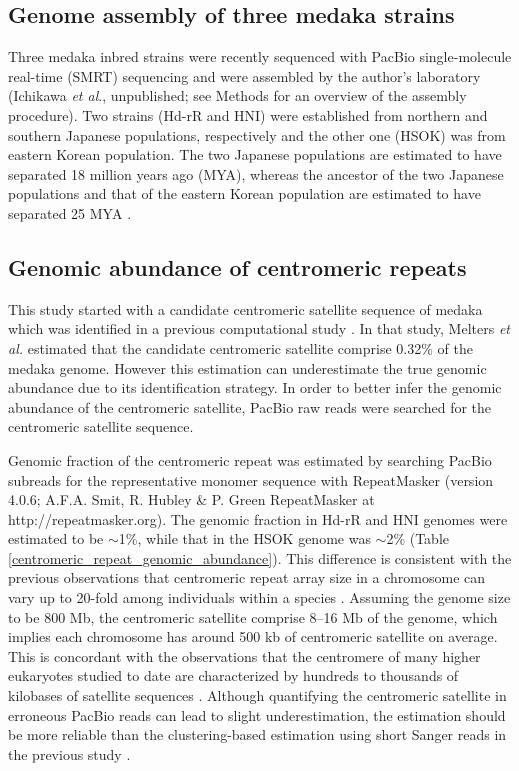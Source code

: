\subsection*{Genome assembly of three medaka strains}
  Three medaka inbred strains were recently sequenced with PacBio single-molecule real-time (SMRT) sequencing and were assembled by the author's laboratory (Ichikawa \textit{et al}., unpublished; see Methods for an overview of the assembly procedure). Two strains (Hd-rR and HNI) were established from northern and southern Japanese populations, respectively and the other one (HSOK) was from eastern Korean population. The two Japanese populations are estimated to have separated 18 million years ago (MYA), whereas the ancestor of the two Japanese populations and that of the eastern Korean population are estimated to have separated 25 MYA \cite{Setiamarga2009}.


\subsection*{Genomic abundance of centromeric repeats}
  This study started with a candidate centromeric satellite sequence of medaka which was identified in a previous computational study \cite{Melters2013}. In that study, Melters \textit{et al.} estimated that the candidate centromeric satellite comprise 0.32\% of the medaka genome. However this estimation can underestimate the true genomic abundance due to its identification strategy. In order to better infer the genomic abundance of the centromeric satellite, PacBio raw reads were searched for the centromeric satellite sequence.

  Genomic fraction of the centromeric repeat was estimated by searching PacBio subreads for the representative monomer sequence with RepeatMasker (version 4.0.6; A.F.A. Smit, R. Hubley \& P. Green RepeatMasker at http://repeatmasker.org). The genomic fraction in Hd-rR and HNI genomes were estimated to be $\sim$1\%, while that in the HSOK genome was $\sim$2\% (Table \ref{centromeric_repeat_genomic_abundance}). This difference is consistent with the previous observations that centromeric repeat array size in a chromosome can vary up to 20-fold among individuals within a species \cite{Miga2014}. Assuming the genome size to be 800 Mb, the centromeric satellite comprise 8--16 Mb of the genome, which implies each chromosome has around 500 kb of centromeric satellite on average. This is concordant with the observations that the centromere of many higher eukaryotes studied to date are characterized by hundreds to thousands of kilobases of satellite sequences \cite{Plohl2014}. Although quantifying the centromeric satellite in erroneous PacBio reads can lead to slight underestimation, the estimation should be more reliable than the clustering-based estimation using short Sanger reads in the previous study \cite{Melters2013}.


